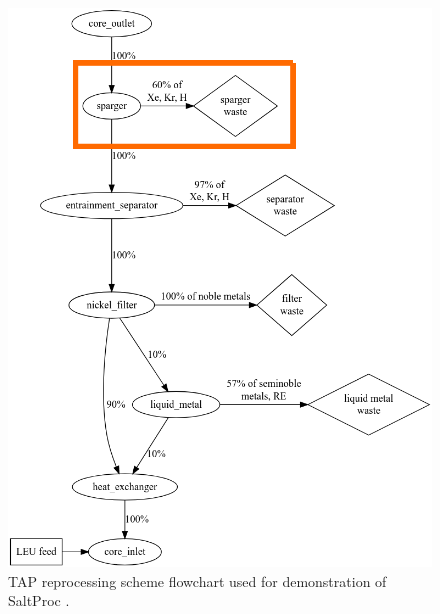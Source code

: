 \begin{frame}
\begin{columns}
\begin{figure}[htp!]
\begin{overprint}
	\includegraphics[height=0.8\textheight]{../figures/demo_reprocessing_scheme_2.png}
		\end{overprint}
	\caption{\gls{TAP} reprocessing scheme flowchart used for demonstration of 
		SaltProc \cite{rykhlevskii_milestone_2019}.}
	\end{figure}
\end{columns}
\end{frame}


